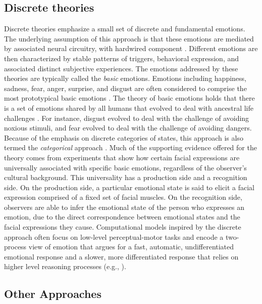 \documentclass[11pt]{article}
\begin{document}
\subsection{Discrete theories}
\label{sec:discrete-emotions}

Discrete theories emphasize a small set of discrete and fundamental emotions.
The underlying assumption of this approach is that these emotions are mediated
by associated neural circuitry, with hardwired component
\cite{ekman:argument-emotions}. Different emotions are then characterized by
stable patterns of triggers, behavioral expression, and associated distinct
subjective experiences. The emotions addressed by these theories are typically
called the \textit{basic} emotions. Emotions including happiness, sadness, fear,
anger, surprise, and disgust are often considered to comprise the most
prototypical basic emotions \cite{ekman:argument-emotions}. The theory of basic
emotions holds that there is a set of emotions shared by all humans that evolved
to deal with ancestral life challenges \cite{ekman:argument-emotions}. For
instance, disgust evolved to deal with the challenge of avoiding noxious
stimuli, and fear evolved to deal with the challenge of avoiding dangers.
Because of the emphasis on discrete categories of states, this approach is also
termed the \textit{categorical} approach \cite{panskepp:affective-neuroscience}.
Much of the supporting evidence offered for the theory comes from experiments
that show how certain facial expressions are universally associated with
specific basic emotions, regardless of the observer's cultural background. This
universality has a production side and a recognition side. On the production
side, a particular emotional state is said to elicit a facial expression
comprised of a fixed set of facial muscles. On the recognition side, observers
are able to infer the emotional state of the person who expresses an emotion,
due to the direct correspondence between emotional states and the facial
expressions they cause. Computational models inspired by the discrete approach
often focus on low-level perceptual-motor tasks and encode a two-process view of
emotion that argues for a fast, automatic, undifferentiated emotional response
and a slower, more differentiated response that relies on higher level
reasoning processes (e.g., \cite{armony:computational-modeling-emotion}).

\subsection{Other Approaches}
\end{document}
